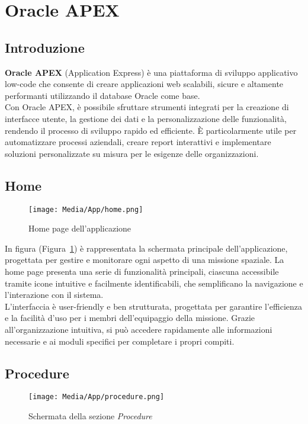 \section{Oracle APEX}

\subsection{Introduzione}
\textbf{Oracle APEX} (Application Express) è una piattaforma di sviluppo applicativo low-code che consente di creare applicazioni web scalabili, sicure e altamente performanti utilizzando il database Oracle come base.\\
Con Oracle APEX, è possibile sfruttare strumenti integrati per la creazione di interfacce utente, la gestione dei dati e la personalizzazione delle funzionalità, rendendo il processo di sviluppo rapido ed efficiente. È particolarmente utile per automatizzare processi aziendali, creare report interattivi e implementare soluzioni personalizzate su misura per le esigenze delle organizzazioni.

\subsection{Home}

\begin{figure}[ht!]
    \centering
    \texttt{[image: Media/App/home.png]}
    \caption{Home page dell'applicazione}
    \label{fig:home_page}
\end{figure}

\noindent
In figura (Figura~\ref{fig:home_page}) è rappresentata la schermata principale dell'applicazione, progettata per gestire e monitorare ogni aspetto di una missione spaziale. La home page presenta una serie di funzionalità principali, ciascuna accessibile tramite icone intuitive e facilmente identificabili, che semplificano la navigazione e l'interazione con il sistema.\\
L'interfaccia è user-friendly e ben strutturata, progettata per garantire l'efficienza e la facilità d'uso per i membri dell'equipaggio della missione. Grazie all'organizzazione intuitiva, si può accedere rapidamente alle informazioni necessarie e ai moduli specifici per completare i propri compiti.

\subsection{Procedure}
\label{procedure-apex}
\begin{figure}[ht!]
    \centering
    \texttt{[image: Media/App/procedure.png]}
    \caption{Schermata della sezione \textit{Procedure}}
    \label{fig:procedure}
\end{figure}

